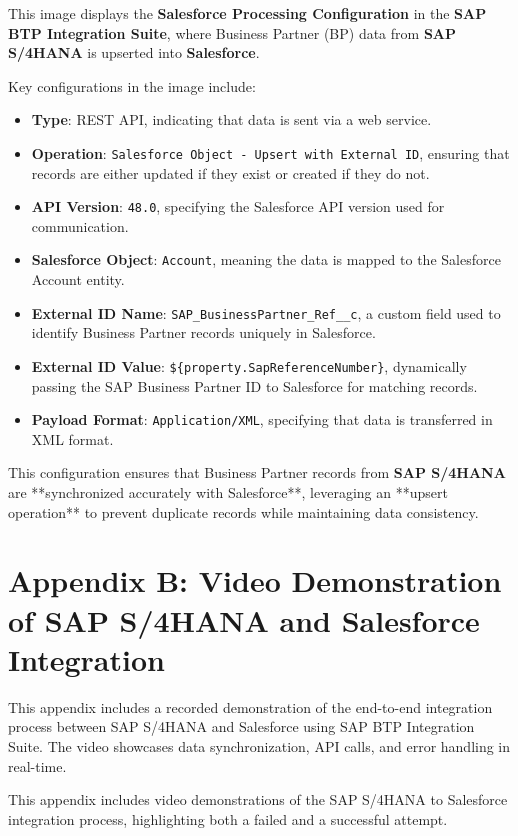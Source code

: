 \noindent This image displays the \textbf{Salesforce Processing Configuration} in the \textbf{SAP BTP Integration Suite}, where Business Partner (BP) data from \textbf{SAP S/4HANA} is upserted into \textbf{Salesforce}.

Key configurations in the image include:
\begin{itemize}
    \item \textbf{Type}: REST API, indicating that data is sent via a web service.
    \item \textbf{Operation}: \texttt{Salesforce Object - Upsert with External ID}, ensuring that records are either updated if they exist or created if they do not.
    \item \textbf{API Version}: \texttt{48.0}, specifying the Salesforce API version used for communication.
    \item \textbf{Salesforce Object}: \texttt{Account}, meaning the data is mapped to the Salesforce Account entity.
    \item \textbf{External ID Name}: \texttt{SAP\_BusinessPartner\_Ref\_\_c}, a custom field used to identify Business Partner records uniquely in Salesforce.
    \item \textbf{External ID Value}: \texttt{\$\{property.SapReferenceNumber\}}, dynamically passing the SAP Business Partner ID to Salesforce for matching records.
    \item \textbf{Payload Format}: \texttt{Application/XML}, specifying that data is transferred in XML format.
\end{itemize}

This configuration ensures that Business Partner records from \textbf{SAP S/4HANA} are **synchronized accurately with Salesforce**, leveraging an **upsert operation** to prevent duplicate records while maintaining data consistency.


\section{Appendix B: Video Demonstration of SAP S/4HANA and Salesforce Integration}

This appendix includes a recorded demonstration of the end-to-end integration process between SAP S/4HANA and Salesforce using SAP BTP Integration Suite. The video showcases data synchronization, API calls, and error handling in real-time.



\noindent This appendix includes video demonstrations of the SAP S/4HANA to Salesforce integration process, highlighting both a failed and a successful attempt.

